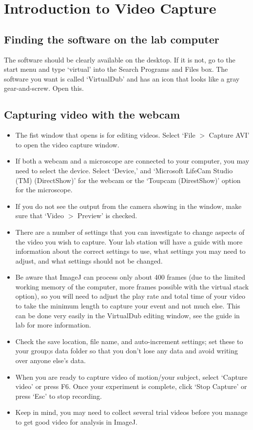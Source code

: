 \chapter{Introduction to Video Capture}
\thispagestyle{fancy}
\section*{Finding the software on the lab computer}
The software should be clearly available on the desktop. 
If it is not, go to the start menu and type `virtual' into the Search Programs and Files box. 
The software you want is called `VirtualDub' and has an icon that looks like a gray gear-and-screw. 
Open this.
\section*{Capturing video with the webcam}
\begin{itemize}
\item The fist window that opens is for editing videos. Select `File $>$ Capture AVI' to open the video capture window.
\item If both a webcam and a microscope are connected to your computer, you may need to select the device. 
Select `Device,' and `Microsoft LifeCam Studio (TM) (DirectShow)' for the webcam or the `Toupcam (DirestShow)' option for the microscope.
\item If you do not see the output from the camera showing in the window, make sure that `Video $>$ Preview' is checked.
\item There are a number of settings that you can investigate to change aspects of the video you wish to capture.
Your lab station will have a guide with more information about the correct settings to use, what settings you may need to adjust, and what settings should not be changed.
\item Be aware that ImageJ can process only about 400 frames (due to the limited working memory of the computer, more frames possible with the virtual stack option), so you will need to adjust the play rate and total time of your video to take the minimum length to capture your event and not much else. This can be done very easily in the VirtualDub editing window, see the guide in lab for more information.
\item Check the save location, file name, and auto-increment settings; set these to your group;s data folder so that you don't lose any data and avoid writing over anyone else's data.
\item When you are ready to capture video of motion/your subject, select `Capture video' or press F6. Once your experiment is complete, click `Stop Capture' or press `Esc' to stop recording. 
\item Keep in mind, you may need to collect several trial videos before you manage to get good video for analysis in ImageJ.
\end{itemize}
